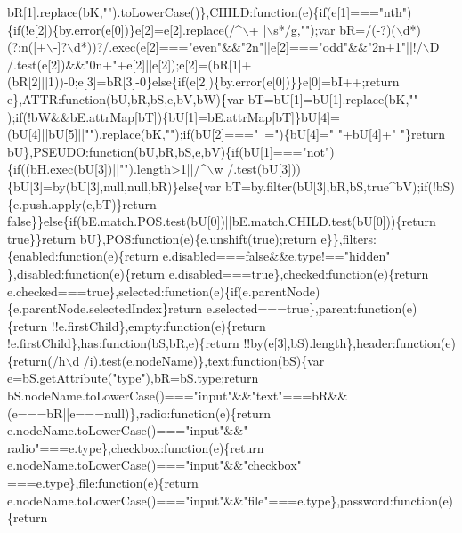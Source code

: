 \begin{DoxyCode}
{       bR[1].replace(bK,"}\textcolor{stringliteral}{").toLowerCase()\},CHILD:function(e)\{if(e[1]==="}nth\textcolor{stringliteral}{")\{if(!e[2])\{by.error(e[0])\}e[2]=e[2].replace(/^\(\backslash\)+
      |\(\backslash\)s*/g,"}\textcolor{stringliteral}{");var bR=/(-?)(\(\backslash\)d*)(?:n([+\(\backslash\)-]?\(\backslash\)d*))?/.exec(e[2]==="}even\textcolor{stringliteral}{"&&"}2n\textcolor{stringliteral}{"||e[2]==="}odd\textcolor{stringliteral}{"&&"}2n+1\textcolor{stringliteral}{"||!/\(\backslash\)D
      /.test(e[2])&&"}0n+\textcolor{stringliteral}{"+e[2]||e[2]);e[2]=(bR[1]+(bR[2]||1))-0;e[3]=bR[3]-0\}else\{if(e[2])\{by.error(e[0])\}\}e[0]=bI++;return
       e\},ATTR:function(bU,bR,bS,e,bV,bW)\{var bT=bU[1]=bU[1].replace(bK,"}\textcolor{stringliteral}{"
      );if(!bW&&bE.attrMap[bT])\{bU[1]=bE.attrMap[bT]\}bU[4]=(bU[4]||bU[5]||"}\textcolor{stringliteral}{").replace(bK,"}\textcolor{stringliteral}{");if(bU[2]==="}~=\textcolor{stringliteral}{")\{bU[4]="} \textcolor{stringliteral}{"+bU[4]+"} \textcolor{stringliteral}{"\}return
       bU\},PSEUDO:function(bU,bR,bS,e,bV)\{if(bU[1]==="}not\textcolor{stringliteral}{")\{if((bH.exec(bU[3])||"}\textcolor{stringliteral}{").length>1||/^\(\backslash\)w
      /.test(bU[3]))\{bU[3]=by(bU[3],null,null,bR)\}else\{var bT=by.filter(bU[3],bR,bS,true^bV);if(!bS)\{e.push.apply(e,bT)\}return
       false\}\}else\{if(bE.match.POS.test(bU[0])||bE.match.CHILD.test(bU[0]))\{return true\}\}return
       bU\},POS:function(e)\{e.unshift(true);return e\}\},filters:\{enabled:function(e)\{return e.disabled===false&&e.type!=="}hidden\textcolor{stringliteral}{"
      \},disabled:function(e)\{return e.disabled===true\},checked:function(e)\{return
       e.checked===true\},selected:function(e)\{if(e.parentNode)\{e.parentNode.selectedIndex\}return e.selected===true\},parent:function(e)\{return
       !!e.firstChild\},empty:function(e)\{return !e.firstChild\},has:function(bS,bR,e)\{return !!by(e[3],bS).length\},header:function(e)\{return(/h\(\backslash\)d
      /i).test(e.nodeName)\},text:function(bS)\{var e=bS.getAttribute("}type\textcolor{stringliteral}{"),bR=bS.type;return
       bS.nodeName.toLowerCase()==="}input\textcolor{stringliteral}{"&&"}text\textcolor{stringliteral}{"===bR&&(e===bR||e===null)\},radio:function(e)\{return e.nodeName.toLowerCase()==="}input\textcolor{stringliteral}{"&&"}
      radio\textcolor{stringliteral}{"===e.type\},checkbox:function(e)\{return e.nodeName.toLowerCase()==="}input\textcolor{stringliteral}{"&&"}checkbox\textcolor{stringliteral}{"
      ===e.type\},file:function(e)\{return e.nodeName.toLowerCase()==="}input\textcolor{stringliteral}{"&&"}file\textcolor{stringliteral}{"===e.type\},password:function(e)\{return
}
\end{DoxyCode}
